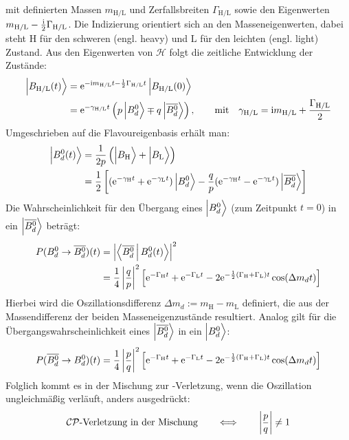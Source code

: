 mit definierten Massen $m_{\text{H/L}}$ und Zerfallsbreiten $\Gamma_{\text{H/L}}$ sowie den Eigenwerten  $m_{\text{H/L}}-\frac{\mathrm{i}}{2}\Gamma_{\text{H/L}}$. Die Indizierung orientiert sich an den Masseneigenwerten, dabei steht $\text{H}$ für den schweren (engl. heavy) und $\text{L}$ für den leichten (engl. light) Zustand. Aus den Eigenwerten von $\mathcal{H}$ folgt die zeitliche Entwicklung der Zustände:
\begin{align}
\nonumber \Ket{B_{\text{H/L}}(t)\vphantom{\text{\Bdbar}}} &= \e^{-\im m_{\text{H/L}}t-\frac{1}{2}\Gamma_{\text{H/L}}t}\Ket{B_{\text{H/L}}(0)\vphantom{\text{\Bdbar}}} \\
                           &= \e^{-\gamma_{\text{H/L}}t}\left(p\Ket{\text{\Bd}\vphantom{\text{\Bdbar}}} \mp q\Ket{\text{\Bdbar}}\right), \qquad
 \text{mit} \quad \gamma_{\text{H/L}} = \im m_{\text{H/L}}+\frac{\Gamma_{\text{H/L}}}{2}
\end{align}
Umgeschrieben auf die Flavoureigenbasis erhält man:
\begin{align}
\nonumber \Ket{\text{\Bd}(t)\vphantom{\text{\Bdbar}}} &= \frac{1}{2p}\left(\Ket{B_{\text{H}}\vphantom{\text{\Bdbar}}} + \Ket{B_{\text{L}}\vphantom{\text{\Bdbar}}}\right) \\
                       &= \frac{1}{2}\left[ (\e^{-\gamma_{\text{H}} t}+\e^{-\gamma_{\text{L}} t})\Ket{\text{\Bd}\vphantom{\text{\Bdbar}}} - \frac{q}{p}(\e^{-\gamma_{\text{H}} t}-\e^{-\gamma_{\text{L}} t})\Ket{\text{\Bdbar}}\right] \label{eg:b(t)}
\end{align}
Die Wahrscheinlichkeit für den Übergang eines $\Ket{\text{\Bd}\vphantom{\text{\Bdbar}}}$ (zum Zeitpunkt $t=0$) in ein $\Ket{\text{$\overline{B_d^0}$}}$ beträgt:
\begin{align}
\nonumber P(\text{$B_d^0$}\rightarrow\text{$\overline{B_d^0}$})(t) &= \left|\Braket{\text{$\overline{B_d^0}$}|\text{$B_d^0$}(t)}\right|^2 \\
                                        &= \frac{1}{4} \left|\frac{q}{p}\right|^2 \left[\mathrm{e}^{-\Gamma_{\text{H}} t} + \mathrm{e}^{-\Gamma_{\text{L}} t} - 2\mathrm{e}^{-\frac{1}{2}(\Gamma_{\text{H}} + \Gamma_{\text{L}}) t}\cos(\Delta m_d t)\right]
\end{align}
Hierbei wird die Oszillationsdifferenz $\Delta m_d := m_{\text{H}} - m_{\text{L}}$ definiert, die aus der Massendifferenz der beiden Masseneigenzustände resultiert. Analog gilt für die Übergangswahrscheinlichkeit eines $\Ket{\text{$\overline{B_d^0}$}}$ in ein $\Ket{\text{\Bd}\vphantom{\text{\Bdbar}}}$:
\begin{align}
P(\text{$\overline{B_d^0}$}\rightarrow \text{$B_d^0$})(t) = \frac{1}{4} \left|\frac{p}{q}\right|^2 \left[\mathrm{e}^{-\Gamma_{\text{H}} t} + \mathrm{e}^{-\Gamma_{\text{L}} t} - 2\mathrm{e}^{-\frac{1}{2}(\Gamma_{\text{H}} + \Gamma_{\text{L}}) t}\cos(\Delta m_d t)\right] 
\end{align}
Folglich kommt es in der Mischung zur \CP-Verletzung, wenn die Oszillation ungleichmäßig verläuft, anders ausgedrückt:
\begin{align}
\text{$\mathcal{CP}$-Verletzung in der Mischung} \qquad \Longleftrightarrow \qquad \left|\frac{p}{q}\right| \neq 1 
\end{align}

